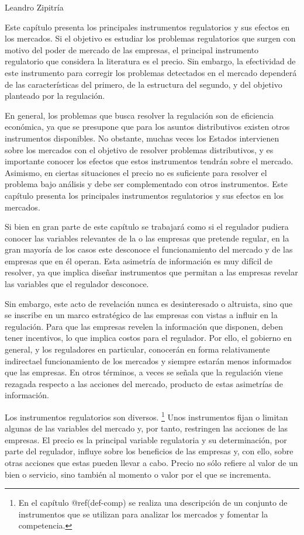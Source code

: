 \documentclass[
  12pt,
  spanish,
]{book}
\begin{document}
Leandro Zipitría

Este capítulo presenta los principales instrumentos regulatorios y sus
efectos en los mercados. Si el objetivo es estudiar los problemas
regulatorios que surgen con motivo del poder de mercado de las empresas,
el principal instrumento regulatorio que considera la literatura es el
precio. Sin embargo, la efectividad de este instrumento para corregir
los problemas detectados en el mercado dependerá de las características
del primero, de la estructura del segundo, y del objetivo planteado por
la regulación.

En general, los problemas que busca resolver la regulación son de
eficiencia económica, ya que se presupone que para los asuntos
distributivos existen otros instrumentos disponibles. No obstante,
muchas veces los Estados intervienen sobre los mercados con el objetivo
de resolver problemas distributivos, y es importante conocer los efectos
que estos instrumentos tendrán sobre el mercado. Asimismo, en ciertas
situaciones el precio no es suficiente para resolver el problema bajo
análisis y debe ser complementado con otros instrumentos. Este capítulo
presenta los principales instrumentos regulatorios y sus efectos en los
mercados.

Si bien en gran parte de este capítulo se trabajará como si el regulador
pudiera conocer las variables relevantes de la o las empresas que
pretende regular, en la gran mayoría de los casos este desconoce el
funcionamiento del mercado y de las empresas que en él operan. Esta
asimetría de información es muy difícil de resolver, ya que implica
diseñar instrumentos que permitan a las empresas revelar las variables
que el regulador desconoce.

Sin embargo, este acto de revelación nunca es desinteresado o altruista,
sino que se inscribe en un marco estratégico de las empresas con vistas
a influir en la regulación. Para que las empresas revelen la información
que disponen, deben tener incentivos, lo que implica costos para el
regulador. Por ello, el gobierno en general, y los reguladores en
particular, conocerán en forma relativamente indirectael funcionamiento
de los mercados y siempre estarán menos informados que las empresas. En
otros términos, a veces se señala que la regulación viene rezagada
respecto a las acciones del mercado, producto de estas asimetrías de
información.

Los instrumentos regulatorios son diversos. \footnote{En el capítulo
  @ref(def-comp) se realiza una descripción de un conjunto de
  instrumentos que se utilizan para analizar los mercados y fomentar la
  competencia.} Unos instrumentos fijan o limitan algunas de las
variables del mercado y, por tanto, restringen las acciones de las
empresas. El precio es la principal variable regulatoria y su
determinación, por parte del regulador, influye sobre los beneficios de
las empresas y, con ello, sobre otras acciones que estas pueden llevar a
cabo. Precio no sólo refiere al valor de un bien o servicio, sino
también al momento o valor por el que se incrementa.
\end{document}
